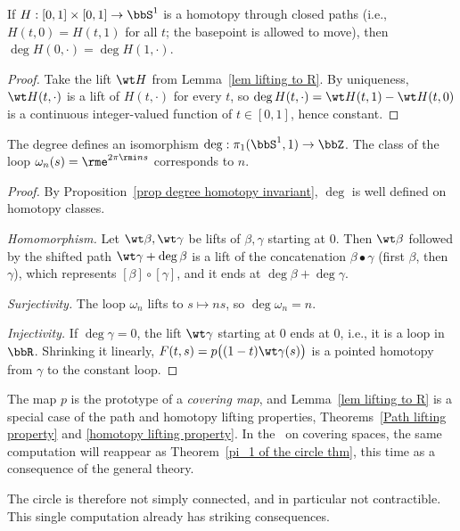 \begin{prop}\label{prop degree homotopy invariant}
    If $H:[0,1]\times[0,1]\to\bbS^1$ is a homotopy through closed paths (i.e., $H(t,0)=H(t,1)$ for all $t$; the basepoint is allowed to move), then $\deg H(0,\cdot)=\deg H(1,\cdot)$.
\end{prop}
\begin{proof}
    Take the lift $\wt H$ from Lemma~\ref{lem lifting to R}. By uniqueness, $\wt H(t,\cdot)$ is a lift of $H(t,\cdot)$ for every $t$, so $\deg H(t,\cdot)=\wt H(t,1)-\wt H(t,0)$ is a continuous integer-valued function of $t\in[0,1]$, hence constant.
\end{proof}

\begin{thm}\label{thm pi1 of circle elementary}
    The degree defines an isomorphism $\deg:\pi_1(\bbS^1,1)\to\bbZ$. The class of the loop $\omega_n(s)=\rme^{2\pi\rmi ns}$ corresponds to $n$.
\end{thm}
\begin{proof}
    By Proposition~\ref{prop degree homotopy invariant}, $\deg$ is well defined on homotopy classes.

    \emph{Homomorphism.} Let $\wt\beta,\wt\gamma$ be lifts of $\beta,\gamma$ starting at $0$. Then $\wt\beta$ followed by the shifted path $\wt\gamma+\deg\beta$ is a lift of the concatenation $\beta\bullet\gamma$ (first $\beta$, then $\gamma$), which represents $[\beta]\circ[\gamma]$, and it ends at $\deg\beta+\deg\gamma$.

    \emph{Surjectivity.} The loop $\omega_n$ lifts to $s\mapsto ns$, so $\deg\omega_n=n$.

    \emph{Injectivity.} If $\deg\gamma=0$, the lift $\wt\gamma$ starting at $0$ ends at $0$, i.e., it is a loop in $\bbR$. Shrinking it linearly, $F(t,s)=p\big((1-t)\wt\gamma(s)\big)$ is a pointed homotopy from $\gamma$ to the constant loop.
\end{proof}

\begin{rem}
    The map $p$ is the prototype of a \emph{covering map}, and Lemma~\ref{lem lifting to R} is a special case of the path and homotopy lifting properties, Theorems~\ref{Path lifting property} and \ref{homotopy lifting property}. In the \chap\ on covering spaces, the same computation will reappear as Theorem~\ref{pi_1 of the circle thm}, this time as a consequence of the general theory.
\end{rem}

The circle is therefore not simply connected, and in particular not contractible. This single computation already has striking consequences.

